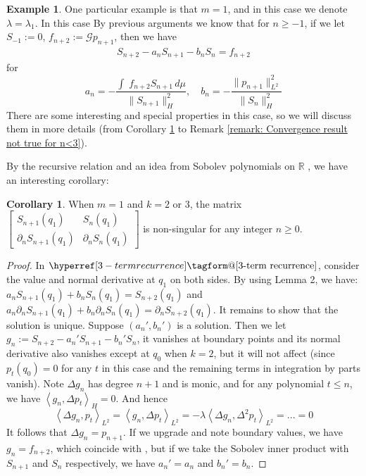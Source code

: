 \documentclass[12pt]{amsart}
\makeatletter
\renewcommand*{\eqref}[1]{%
  \hyperref[{#1}]{\textup{\tagform@{\ref*{#1}}}}%
}
\theoremstyle{plain}
\theoremstyle{definition}
\newtheorem{corollary}{Corollary}[section]
\newtheorem{example}{Example}[section]
\newcommand{\inner}[2]{\left \langle #1, #2\right \rangle}
\newcommand{\lap}{\Delta}
\makeatother
\begin{document}
\begin{example}\label{Example: m=1}
One particular example is that $m=1$, and in this case we denote $\lambda=\lambda_1$. In this case By previous arguments we know that for $n\geq-1$, if we  let $S_{-1}:=0$, $f_{n+2}:=\mathcal{G}p_{n+1}$,
then we have 
    \begin{align}S_{n+2} - a_nS_{n+1}-b_nS_n = f_{n+2}\label{3-term recurrence}\end{align}for $$a_n=-\frac{\int\;f_{n+2}S_{n+1}\,d\mu}{\|S_{n+1}\|_H^2},\quad b_n=-\frac{\|p_{n+1}\|_{L^2}^2}{\|S_n\|_H^2}$$
There are some interesting and special properties in this case, so we will discuss them in more details (from Corollary \ref{Corollary: the invertibility of the k=2,3 matrix} to Remark \ref{remark: Convergence result not true for n<3}).
    \end{example}
    By the recursive relation \eqref{3-term recurrence} and an idea from Sobolev polynomials on $\mathbb{R}$ \cite{MX}, we have an interesting corollary:
\begin{corollary}\label{Corollary: the invertibility of the k=2,3 matrix}
When $m=1$ and $k =2$ or $3$, the matrix $\left[\begin{matrix}
S_{n+1}(q_1)&S_n(q_1)\\
\partial_n S_{n+1}(q_1) &\partial_n S_n(q_1)
\end{matrix}\right]$ is non-singular for any integer $n\geq 0$.
\end{corollary}
\begin{proof}
In $\eqref{3-term recurrence}$, consider the value and normal derivative at $q_1$ on both sides. By using Lemma 2, we have:
$a_n S_{n+1}(q_1)+b_nS_n(q_1)=S_{n+2}(q_1)$ and $a_n \partial_n S_{n+1}(q_1)+b_n\partial_n S_n(q_1)=\partial_n S_{n+2}(q_1)$. 
It remains to show that the solution is unique. Suppose $(a_n', b_n')$ is a solution. Then we let $g_n:= S_{n+2}-a_n' S_{n+1}-b_n' S_n$, it vanishes at boundary points and its normal derivative also vanishes except at $q_0$ when $k=2$, but it will not affect (since $p_t(q_0)=0$ for any $t$ in this case and the remaining terms in integration by parts vanish). Note $\lap g_n$ has degree $n+1$ and is monic, and for any polynomial $t\leq n$, we have $\inner{g_n}{\lap p_t}_H=0$. And hence $$
\inner{\lap g_n}{p_t}_{L^2}=\inner{g_n}{\lap p_t}_{L^2}=-\lambda\inner{\lap g_n}{\lap^2 p_t}_{L^2}=...=0$$
It follows that $\lap g_n=p_{n+1}$. If we upgrade and note boundary values, we have $g_n=f_{n+2}$, which coincide with \eqref{3-term recurrence}, but if we take the Sobolev inner product with $S_{n+1}$ and $S_n$ respectively, we have $a_n'=a_n$ and $b_n'=b_n$.
\end{proof}
\end{document}
